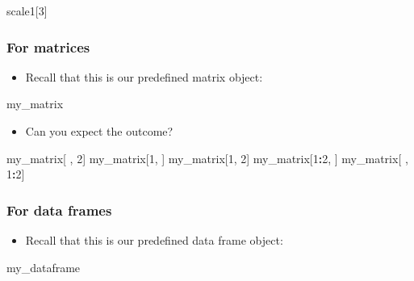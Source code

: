 \documentclass[
]{book}
\newenvironment{Shaded}{\begin{snugshade}}{\end{snugshade}}
\newcommand{\DecValTok}[1]{\textcolor[rgb]{0.00,0.00,0.81}{#1}}
\newcommand{\NormalTok}[1]{#1}
\newcommand{\SpecialCharTok}[1]{\textcolor[rgb]{0.81,0.36,0.00}{\textbf{#1}}}
\providecommand{\tightlist}{%
  \setlength{\itemsep}{0pt}\setlength{\parskip}{0pt}}
\begin{document}
\begin{Shaded}
\begin{Highlighting}[]
\NormalTok{scale1[}\DecValTok{3}\NormalTok{]}
\end{Highlighting}
\end{Shaded}

\subsubsection{For matrices}\label{for-matrices}

\begin{itemize}
\tightlist
\item
  Recall that this is our predefined matrix object:
\end{itemize}

\begin{Shaded}
\begin{Highlighting}[]
\NormalTok{my\_matrix}
\end{Highlighting}
\end{Shaded}

\begin{itemize}
\tightlist
\item
  Can you expect the outcome?
\end{itemize}

\begin{Shaded}
\begin{Highlighting}[]
\NormalTok{my\_matrix[ , }\DecValTok{2}\NormalTok{]}
\NormalTok{my\_matrix[}\DecValTok{1}\NormalTok{,  ]}
\NormalTok{my\_matrix[}\DecValTok{1}\NormalTok{, }\DecValTok{2}\NormalTok{]}
\NormalTok{my\_matrix[}\DecValTok{1}\SpecialCharTok{:}\DecValTok{2}\NormalTok{,  ]}
\NormalTok{my\_matrix[ , }\DecValTok{1}\SpecialCharTok{:}\DecValTok{2}\NormalTok{]}
\end{Highlighting}
\end{Shaded}

\subsubsection{For data frames}\label{for-data-frames}

\begin{itemize}
\tightlist
\item
  Recall that this is our predefined data frame object:
\end{itemize}

\begin{Shaded}
\begin{Highlighting}[]
\NormalTok{my\_dataframe}
\end{Highlighting}
\end{Shaded}
\end{document}
